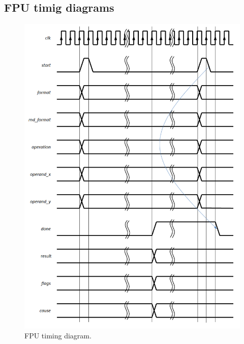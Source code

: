 \subsection{FPU timig diagrams}
\begin{figure}
\begin{center}
\includegraphics[scale=0.35]{./figures/fpu_timing.png}
\end{center}
\caption{FPU timing diagram.}
\label{fig:fpu_timing}
\end{figure}
